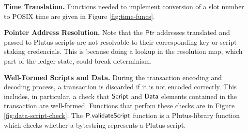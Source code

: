 \textbf{Time Translation.}
Functions needed to implement conversion of a slot number to POSIX time are
given in Figure \ref{fig:time-funcs}.

\textbf{Pointer Address Resolution. }
Note that the $\mathsf{Ptr}$ addresses translated and passed to Plutus scripts are
not resolvable to their corresponding key or script staking credencials. This
is because doing a lookup in the resolution map, which part of the ledger state,
could break determinism.

\textbf{Well-Formed Scripts and Data. }
During the transaction encoding and decoding process, a transaction is discarded if it is not
encoded correctly. This includes, in particular, a check that $\mathsf{Script}$ and $\mathsf{Data}$
elements contained in the transaction are well-formed. Functions that perfom these checks are
in Figure \ref{fig:data-script-check}. The $\mathsf{P.validateScript}$ function
is a Plutus-library function which checks whether a bytestring represents a
Plutus script.

